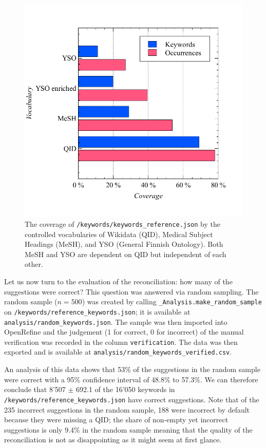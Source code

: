 \begin{figure}
\centering
\includegraphics{images/native_gold_standard.pdf}
\caption{The coverage of \texttt{/keywords/keywords\_reference.json} by
the controlled vocabularies of Wikidata (QID), Medical Subject Headings
(MeSH), and YSO (General Finnish Ontology). Both MeSH and YSO are
dependent on QID but independent of each other.}
\end{figure}

Let us now turn to the evaluation of the reconciliation: how many of the
suggestions were correct? This question was answered via random
sampling. The random sample (\(n=500\)) was created by calling
\texttt{\_Analysis.make\_random\_sample} on
\texttt{/keywords/reference\_keywords.json}; it is available at
\texttt{analysis/random\_keywords.json}. The sample was then imported
into OpenRefine and the judgement (1 for correct, 0 for incorrect) of
the manual verification was recorded in the column
\texttt{verification}. The data was then exported and is available at
\texttt{analysis/random\_keywords\_verified.csv}.

An analysis of this data shows that 53\% of the suggestions in the
random sample were correct with a 95\% confidence interval of 48.8\% to
57.3\%. We can therefore conclude that 8'507 \(\pm\) 692.1 of the 16'050
keywords in \texttt{/keywords/reference\_keywords.json} have correct
suggestions. Note that of the 235 incorrect suggestions in the random
sample, 188 were incorrect by default because they were missing a QID;
the share of non-empty yet incorrect suggestions is only 9.4\% in the
random sample meaning that the quality of the reconciliation is not as
disappointing as it might seem at first glance.

